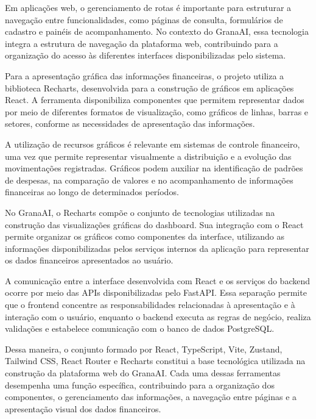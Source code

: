 Em aplicações web, o gerenciamento de rotas é importante para estruturar a navegação entre funcionalidades, como páginas de consulta, formulários de cadastro e painéis de acompanhamento. No contexto do GranaAI, essa tecnologia integra a estrutura de navegação da plataforma web, contribuindo para a organização do acesso às diferentes interfaces disponibilizadas pelo sistema.

Para a apresentação gráfica das informações financeiras, o projeto utiliza a biblioteca Recharts, desenvolvida para a construção de gráficos em aplicações React. A ferramenta disponibiliza componentes que permitem representar dados por meio de diferentes formatos de visualização, como gráficos de linhas, barras e setores, conforme as necessidades de apresentação das informações.

A utilização de recursos gráficos é relevante em sistemas de controle financeiro, uma vez que permite representar visualmente a distribuição e a evolução das movimentações registradas. Gráficos podem auxiliar na identificação de padrões de despesas, na comparação de valores e no acompanhamento de informações financeiras ao longo de determinados períodos.

No GranaAI, o Recharts compõe o conjunto de tecnologias utilizadas na construção das visualizações gráficas do dashboard. Sua integração com o React permite organizar os gráficos como componentes da interface, utilizando as informações disponibilizadas pelos serviços internos da aplicação para representar os dados financeiros apresentados ao usuário.

A comunicação entre a interface desenvolvida com React e os serviços do backend ocorre por meio das APIs disponibilizadas pelo FastAPI. Essa separação permite que o frontend concentre as responsabilidades relacionadas à apresentação e à interação com o usuário, enquanto o backend executa as regras de negócio, realiza validações e estabelece comunicação com o banco de dados PostgreSQL.

Dessa maneira, o conjunto formado por React, TypeScript, Vite, Zustand, Tailwind CSS, React Router e Recharts constitui a base tecnológica utilizada na construção da plataforma web do GranaAI. Cada uma dessas ferramentas desempenha uma função específica, contribuindo para a organização dos componentes, o gerenciamento das informações, a navegação entre páginas e a apresentação visual dos dados financeiros.



